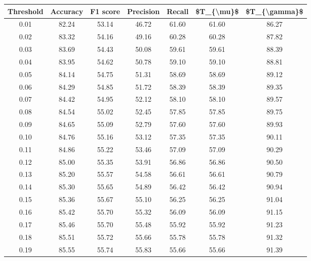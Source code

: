 \begin{tabular}{|c|c|c|c|c|c|c|}
\hline
 Threshold &  Accuracy &  F1 score &  Precision &  Recall &  \$T\_\{\textbackslash mu\}\$ &  \$T\_\{\textbackslash gamma\}\$ \\
\hline
      0.01 &     82.24 &     53.14 &      46.72 &   61.60 &      61.60 &         86.27 \\
      0.02 &     83.32 &     54.16 &      49.16 &   60.28 &      60.28 &         87.82 \\
      0.03 &     83.69 &     54.43 &      50.08 &   59.61 &      59.61 &         88.39 \\
      0.04 &     83.95 &     54.62 &      50.78 &   59.10 &      59.10 &         88.81 \\
      0.05 &     84.14 &     54.75 &      51.31 &   58.69 &      58.69 &         89.12 \\
      0.06 &     84.29 &     54.85 &      51.72 &   58.39 &      58.39 &         89.35 \\
      0.07 &     84.42 &     54.95 &      52.12 &   58.10 &      58.10 &         89.57 \\
      0.08 &     84.54 &     55.02 &      52.45 &   57.85 &      57.85 &         89.75 \\
      0.09 &     84.65 &     55.09 &      52.79 &   57.60 &      57.60 &         89.93 \\
      0.10 &     84.76 &     55.16 &      53.12 &   57.35 &      57.35 &         90.11 \\
      0.11 &     84.86 &     55.22 &      53.46 &   57.09 &      57.09 &         90.29 \\
      0.12 &     85.00 &     55.35 &      53.91 &   56.86 &      56.86 &         90.50 \\
      0.13 &     85.20 &     55.57 &      54.58 &   56.61 &      56.61 &         90.79 \\
      0.14 &     85.30 &     55.65 &      54.89 &   56.42 &      56.42 &         90.94 \\
      0.15 &     85.36 &     55.67 &      55.10 &   56.25 &      56.25 &         91.04 \\
      0.16 &     85.42 &     55.70 &      55.32 &   56.09 &      56.09 &         91.15 \\
      0.17 &     85.46 &     55.70 &      55.48 &   55.92 &      55.92 &         91.23 \\
      0.18 &     85.51 &     55.72 &      55.66 &   55.78 &      55.78 &         91.32 \\
      0.19 &     85.55 &     55.74 &      55.83 &   55.66 &      55.66 &         91.39 \\

\end{tabular}

